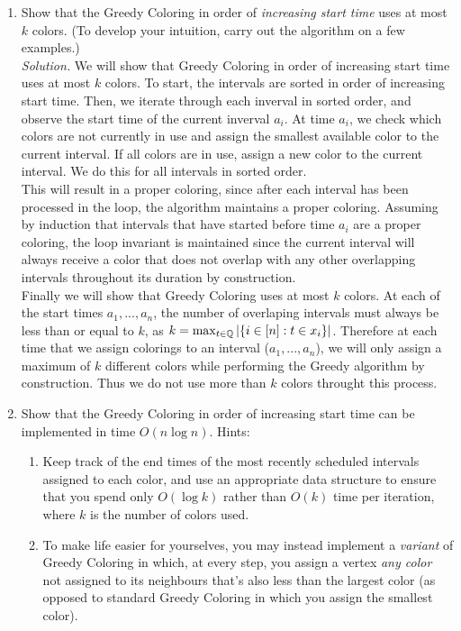 \documentclass[11pt]{article}
\begin{document}
\begin{enumerate}
\begin{enumerate}
     \item Show that the Greedy Coloring in order of {\em increasing start time} uses at most $k$ colors.  (To develop your intuition, carry out the algorithm on a few examples.) \\
     
     \textit{Solution. } We will show that Greedy Coloring in order of increasing start time uses at most $k$ colors. To start, the intervals are sorted in order of increasing start time. Then, we iterate through each inverval in sorted order, and observe the start time of the current inverval $a_i$. At time $a_i$, we check which colors are not currently in use and assign the smallest available color to the current interval. If all colors are in use, assign a new color to the current interval. We do this for all intervals in sorted order. \\

     This will result in a proper coloring, since after each interval has been processed in the loop, the algorithm maintains a proper coloring. Assuming by induction that intervals that have started before time $a_i$ are a proper coloring, the loop invariant is maintained since the current interval will always receive a color that does not overlap with any other overlapping intervals throughout its duration by construction. \\

     Finally we will show that Greedy Coloring uses at most $k$ colors. At each of the start times $a_1, ..., a_n$, the number of overlaping intervals must always be less than or equal to $k$, as $k = \max_{t\in \mathbb{Q}} |\{ i\in [n]: t\in x_i\}|$. Therefore at each time that we assign colorings to an interval ($a_1, ..., a_n$), we will only assign a maximum of $k$ different colors while performing the Greedy algorithm by construction. Thus we do not use more than $k$ colors throught this process.\\

    \item Show that the Greedy Coloring in order of increasing start time can be implemented in time $O(n\log n)$. Hints: \begin{enumerate}
        \item Keep track of the end times of the most recently scheduled intervals assigned to each color, and use an appropriate data structure to ensure that you spend only $O(\log k)$ rather than $O(k)$ time per iteration, where $k$ is the number of colors used.
        \item To make life easier for yourselves, you may instead implement a \emph{variant} of Greedy Coloring in which, at every step, you assign a vertex \emph{any color} not assigned to its neighbours that's also less than the largest color (as opposed to standard Greedy Coloring in which you assign the smallest color).
    \end{enumerate}
         

\end{enumerate}
\end{enumerate}
\end{document}
